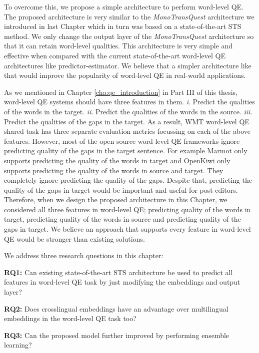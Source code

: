 To overcome this, we propose a simple architecture to perform word-level QE. The proposed architecture is very similar to the \textit{MonoTransQuest} architecture we introduced in last Chapter which in turn was based on a state-of-the-art STS method. We only change the output layer of the \textit{MonoTransQuest} architecture so that it can retain word-level qualities. This architecture is very simple and effective when compared with the current state-of-the-art word-level QE architectures like predictor-estimator. We believe that a simpler architecture like that would improve the popularity of word-level QE in real-world applications. 

As we mentioned in Chapter \ref{cha:qe_introduction} in Part III of this thesis, word-level QE systems should have three features in them. \textit{i}. Predict the qualities of the words in the target. \textit{ii}. Predict the qualities of the words in the source. \textit{iii}. Predict the qualities of the gaps in the target. As a result, WMT word-level QE shared task has three separate evaluation metrics focussing on each of the above features. However, most of the open source word-level QE frameworks ignore predicting quality of the gaps in the target sentence. For example Marmot \autocite{logacheva-etal-2016-marmot} only supports predicting the quality of the words in target and OpenKiwi \autocite{kepler-etal-2019-openkiwi} only supports predicting the quality of the words in source and target. They completely ignore predicting the quality of the gaps. Despite that, predicting the quality of the gaps in target would be important and useful for post-editors. Therefore, when we design the proposed architecture in this Chapter, we considered all three features in word-level QE; predicting quality of the words in target, predicting quality of the words in source and predicting quality of the gaps in target. We believe an approach that supports every feature in word-level QE would be stronger than existing solutions.

We address three research questions in this chapter:

\textbf{RQ1:} Can existing state-of-the-art STS architecture be used to predict all features in word-level QE task by just modifying the embeddings and output layer?

\textbf{RQ2:} Does crosslingual embeddings have an advantage over multilingual embeddings in the word-level QE task too?

\textbf{RQ3:} Can the proposed model further improved by performing ensemble learning?


